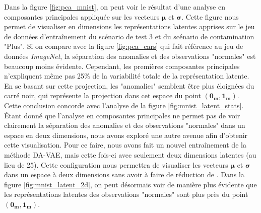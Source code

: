 Dans la figure \ref{fig:pca_mnist}, on peut voir le résultat d'une analyse en composantes principales appliquée sur les vecteurs $\boldsymbol{\mu}$ et $\boldsymbol{\sigma}$. Cette figure nous permet de visualiser en \DIFdelbegin {}\DIFdelend \DIFaddbegin {}\DIFaddend dimensions les représentations latentes apprises sur le jeu de données d'entraînement du scénario de test 3 et du scénario de contamination "Plus". Si on compare avec la figure \ref{fig:pca_cars} qui fait référence au jeu de données \textit{ImageNet}, la séparation des anomalies et des observations "normales" est beaucoup moins évidente. Cependant, les \DIFdelbegin {}\DIFdelend \DIFaddbegin {}\DIFaddend premières composantes principales n'expliquent même pas 25\% de la variabilité totale de la représentation latente. En se basant sur cette projection, les "anomalies" semblent être plus éloignées du carré noir, qui représente la projection dans cet espace du point $(\boldsymbol{0_{m}}, \boldsymbol{1_{m}})$. Cette conclusion concorde avec l'analyse de la figure \ref{fig:mnist_latent_stats}. Étant donné que l'analyse en composantes principales ne permet pas de voir clairement la séparation des anomalies et des observations "normales" dans un espace en deux dimensions, nous avons exploré une autre avenue afin d'obtenir cette visualisation. Pour ce faire, nous avons fait un nouvel entraînement de la méthode DA-VAE, mais cette fois-ci avec seulement deux dimensions latentes (au lieu de 25). Cette configuration nous permettra de visualiser les vecteurs $\boldsymbol{\mu}$ et $\boldsymbol{\sigma}$ dans un espace à deux dimensions sans avoir à faire de réduction de \DIFdelbegin {}\DIFdelend \DIFaddbegin {}\DIFaddend . Dans la figure \ref{fig:mnist_latent_2d}, on peut désormais voir de manière plus évidente que les représentations latentes des observations "normales" sont plus près du point $(\boldsymbol{0_{m}}, \boldsymbol{1_{m}})$.

